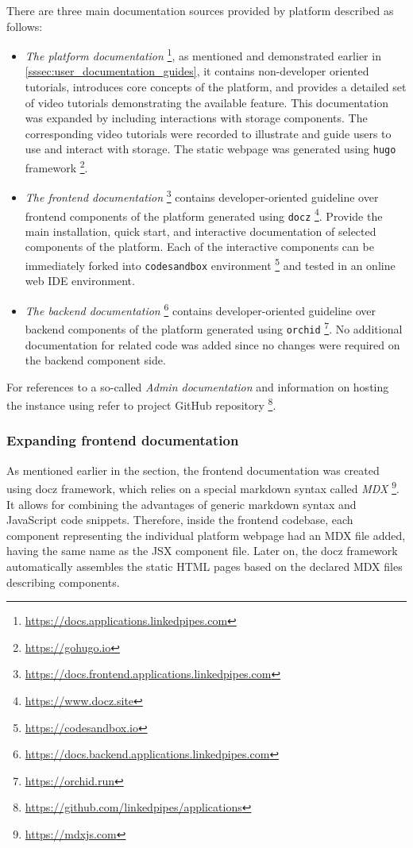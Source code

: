 There are three main documentation sources provided by \lpa{} platform described as follows:
\begin{itemize}
    \item \textit{The platform documentation} \footnote{\url{https://docs.applications.linkedpipes.com}}, as mentioned and demonstrated earlier in \autoref{sssec:user_documentation_guides}, it contains non-developer oriented tutorials, introduces core concepts of the platform, and provides a detailed set of video tutorials demonstrating the available feature. This documentation was expanded by including interactions with storage components. The corresponding video tutorials were recorded to illustrate and guide users to use and interact with storage. The static webpage was generated using \texttt{hugo} framework \footnote{\url{https://gohugo.io}}.
    \item \textit{The frontend documentation} \footnote{\url{https://docs.frontend.applications.linkedpipes.com}} contains developer-oriented guideline over frontend components of the platform generated using \texttt{docz} \footnote{\url{https://www.docz.site}}. Provide the main installation, quick start, and interactive documentation of selected components of the platform. Each of the interactive components can be immediately forked into \texttt{codesandbox} environment \footnote{\url{https://codesandbox.io}} and tested in an online web IDE environment. 
    \item \textit{The backend documentation} \footnote{\url{https://docs.backend.applications.linkedpipes.com}} contains developer-oriented guideline over backend components of the platform generated using \texttt{orchid} \footnote{\url{https://orchid.run}}. No additional documentation for \lpas{} related code was added since no changes were required on the backend component side.
\end{itemize}

For references to a so-called \textit{Admin documentation} and information on hosting the \lpa{} instance using \lpas{} refer to project GitHub repository \footnote{\url{https://github.com/linkedpipes/applications}}. 

\subsubsection{Expanding frontend documentation}

As mentioned earlier in the section, the frontend documentation was created using docz framework, which relies on a special markdown syntax called \textit{MDX} \footnote{\url{https://mdxjs.com}}. It allows for combining the advantages of generic markdown syntax and JavaScript code snippets. Therefore, inside the frontend codebase, each component representing the individual platform webpage had an MDX file added, having the same name as the JSX component file. Later on, the docz framework automatically assembles the static HTML pages based on the declared MDX files describing components. 

